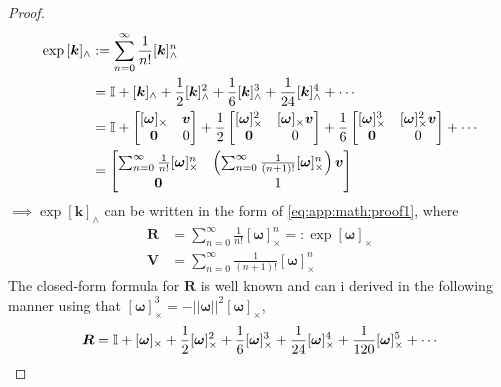 \begin{proof}
\begin{subequations}
\begin{align*}
    \exp{[\bm{k}]_{\wedge}} &:= \sum_{n=0}^{\infty} \frac{1}{n!}[\bm{k}]_{\wedge}^n \\
    &= \mathbb{I} + [\bm{k}]_{\wedge} + \frac{1}{2}[\bm{k}]_{\wedge}^2 + \frac{1}{6}[\bm{k}]_{\wedge}^3 + \frac{1}{24}[\bm{k}]_{\wedge}^4 + \cdots \\
    &= \mathbb{I} + \begin{bmatrix}[\bm{\omega}]_{\times} & \bm{v} \\ \bm{0} & 0\end{bmatrix}
       + \frac{1}{2}\begin{bmatrix}[\bm{\omega}]_{\times}^2 & [\bm{\omega}]_{\times}\bm{v} \\ \bm{0} & 0\end{bmatrix}
       + \frac{1}{6}\begin{bmatrix}[\bm{\omega}]_{\times}^3 & [\bm{\omega}]_{\times}^2\bm{v} \\ \bm{0} & 0\end{bmatrix}
       + \cdots\\
       &= \begin{bmatrix}
\sum_{n=0}^{\infty} \frac{1}{n!}[\bm{\omega}]_{\times}^n &
\left(\sum_{n=0}^{\infty} \frac{1}{\left(n+1\right)!}[\bm{\omega}]_{\times}^n \right) \bm{v}\\
\bm{0} & 1 \\
       \end{bmatrix}
\end{align*}
\end{subequations}
\(\implies \exp{[\bm{k}]_{\wedge}}\) can be written in the form of \autoref{eq:app:math:proof1},
where
\begin{subequations}
\begin{align*}
    \bm{R} &= \sum_{n=0}^{\infty} \frac{1}{n!}[\bm{\omega}]_{\times}^n =: \exp{[\bm{\omega}]_{\times}}\\
    \bm{V} &= \sum_{n=0}^{\infty} \frac{1}{\left(n+1\right)!}[\bm{\omega}]_{\times}^n
\end{align*}
\end{subequations}
The closed-form formula for \(\bm{R}\) is well known and can i derived in the following manner
using that \([\bm{\omega}]_{\times}^3 = -||\bm{\omega}||^2[\bm{\omega}]_{\times}\),
\begin{subequations}
\begin{align*}
\bm{R} &= \I + [\bm{\omega}]_{\times} + \frac{1}{2}[\bm{\omega}]_{\times}^2 + \frac{1}{6}[\bm{\omega}]_{\times}^3 + \frac{1}{24}[\bm{\omega}]_{\times}^4 + \frac{1}{120}[\bm{\omega}]_{\times}^5 + \cdots \\

\end{align*}
\end{subequations}
\end{proof}

